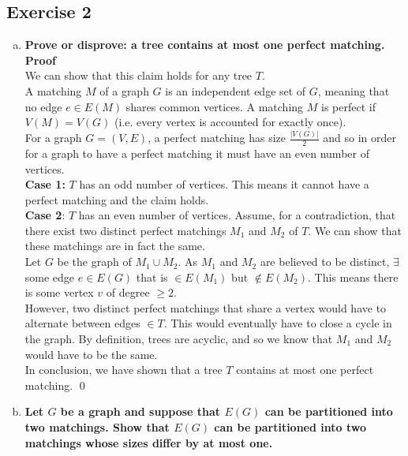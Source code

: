 \subsection*{Exercise 2}
\begin{enumerate}[a)]
\boldmath
\item \textbf{Prove or disprove: a tree contains at most one perfect matching.} \\
\unboldmath
\linebreak 
\textbf{Proof}\\
We can show that this claim holds for any tree $T$. \\
\linebreak 
A matching $M$ of a graph $G$ is an independent edge set of $G$, meaning that no edge $e \in E(M)$ shares common vertices. A matching $M$ is perfect if $V(M) = V(G)$ (i.e. every vertex is accounted for exactly once). \\
\linebreak For a graph $G = (V, E)$, a perfect matching has size $\frac{|V(G)|}{2}$ and so in order for a graph to have a perfect matching it must have an even number of vertices.  \\
\linebreak 
\textbf{Case 1:} $T$ has an odd number of vertices. This means it cannot have a perfect matching and the claim holds. \\
\linebreak 
\textbf{Case 2}: $T$ has an even number of vertices. Assume, for a contradiction, that there exist two distinct perfect matchings $M_1$ and $M_2$ of $T$. We can show that these matchings are in fact the same.\\
\linebreak
Let $G$ be the graph of $M_1 \cup M_2$. As $M_1$ and $M_2$ are believed to be distinct, $\exists$ some edge $e \in E(G)$ that is $\in E(M_1)$ but $\notin E(M_2)$. This means there is some vertex $v$ of degree $\geq 2$. \\
\linebreak 
However, two distinct perfect matchings that share a vertex would have to alternate between edges $\in T$. This would eventually have to close a cycle in the graph. By definition, trees are acyclic, and so we know that $M_1$ and $M_2$ would have to be the same. \\
\linebreak 
In conclusion, we have shown that a tree $T$ contains at most one perfect matching. \qed
\boldmath 
\item \textbf{Let $G$ be a graph and suppose that $E(G)$ can be partitioned into two matchings. Show that $E(G)$ can be partitioned into two matchings whose sizes differ by at most one.} \\

\end{enumerate}
